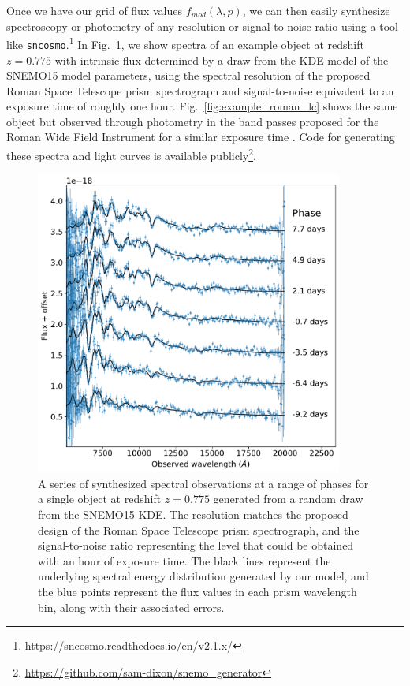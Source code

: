 Once we have our grid of flux values $f_{mod}(\lambda, p)$, we can then easily synthesize spectroscopy or photometry of any resolution or signal-to-noise ratio using a tool like \verb|sncosmo|.\footnote{\url{https://sncosmo.readthedocs.io/en/v2.1.x/}}  In Fig.~\ref{fig:example_prism_spec}, we show spectra of an example object at redshift $z=0.775$ with intrinsic flux determined by a draw from the KDE model of the SNEMO15 model parameters, using the spectral resolution of the proposed Roman Space Telescope prism spectrograph and signal-to-noise equivalent to an exposure time of roughly one hour. Fig.~\ref{fig:example_roman_lc} shows the same object but observed through photometry in the band passes proposed for the Roman Wide Field Instrument for a similar exposure time \citep{rubin_evaluating_2020, roman_space_telescope_reference_information_roman_2019}. Code for generating these spectra and light curves is available publicly\footnote{\url{https://github.com/sam-dixon/snemo_generator}}.

\begin{figure}
    \centering
    \includegraphics[width=0.9\textwidth]{figures/snemo_kde/example_roman_spec.pdf}
    \caption{A series of synthesized spectral observations at a range of phases for a single object at redshift $z=0.775$ generated from a random draw from the SNEMO15 KDE. The resolution matches the proposed design of the Roman Space Telescope prism spectrograph, and the signal-to-noise ratio representing the level that could be obtained with an hour of exposure time. The black lines represent the underlying spectral energy distribution generated by our model, and the blue points represent the flux values in each prism wavelength bin, along with their associated errors.}
    \label{fig:example_prism_spec}
\end{figure}

